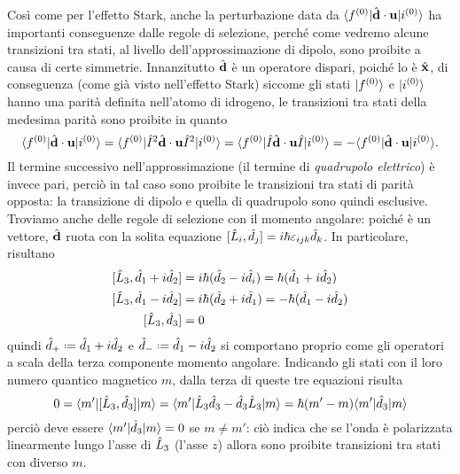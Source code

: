 Cos\`i come per l'effetto Stark, anche la perturbazione data da $\langle f^{(0)}\rvert{\hat{\mathbf{d}}}\cdot{\mathbf{u}}\lvert i^{(0)}\rangle$ ha importanti conseguenze dalle regole di selezione, perch\'e come vedremo alcune transizioni tra stati, al livello dell'approssimazione di dipolo, sono proibite a causa di certe simmetrie.
Innanzitutto $\hat{\mathbf{d}}$ è un operatore dispari, poich\'e lo è $\hat{\mathbf{x}}$, di conseguenza (come già visto nell'effetto Stark) siccome gli stati $\lvert f^{(0)}\rangle$ e $\lvert i^{(0)}\rangle$ hanno una parità definita nell'atomo di idrogeno, le transizioni tra stati della medesima parità sono proibite in quanto
\begin{equation}
	\langle f^{(0)}\rvert{\hat{\mathbf{d}}}\cdot{\mathbf{u}}\lvert i^{(0)}\rangle=
	\langle f^{(0)}\rvert\hat{I}^2{\hat{\mathbf{d}}}\cdot{\mathbf{u}}\hat{I}^2\lvert i^{(0)}\rangle=
	\langle f^{(0)}\rvert\hat{I}{\hat{\mathbf{d}}}\cdot{\mathbf{u}}\hat{I}\lvert i^{(0)}\rangle=
	-\langle f^{(0)}\rvert{\hat{\mathbf{d}}}\cdot{\mathbf{u}}\lvert i^{(0)}\rangle.
\end{equation}
Il termine successivo nell'approssimazione (il termine di \emph{quadrupolo elettrico}) è invece pari, perciò in tal caso sono proibite le transizioni tra stati di parità opposta: la transizione di dipolo e quella di quadrupolo sono quindi esclusive.
Troviamo anche delle regole di selezione con il momento angolare: poich\'e è un vettore, $\hat{\mathbf{d}}$ ruota con la solita equazione $[\hat{L}_i,\hat{d}_j]=i\hbar\varepsilon_{ijk}\hat{d}_k$.
In particolare, risultano
\begin{equation}
	\begin{aligned}
		[\op L_3,\op d_1+i\op d_2]&=i\hbar(\op d_2-i\op d_i)=\hbar(\op d_1+i\op d_2)\\
		[\op L_3,\op d_1-i\op d_2]&=i\hbar(\op d_2+i\op d_1)=-\hbar(\op d_1-i\op d_2)\\
		[\op L_3,\op d_3]&=0
	\end{aligned}
	\label{eq:operatore-dipolo-scala-momento-angolare}
\end{equation}
quindi $\op d_+\defeq \op d_1+i\op d_2$ e $\op d_-\defeq\op d_1-i\op d_2$ si comportano proprio come gli operatori a scala della terza componente momento angolare.
Indicando gli stati con il loro numero quantico magnetico $m$, dalla terza di queste tre equazioni risulta
\begin{equation}
	0=\langle m'\rvert[\hat{L}_3,\hat{d}_3]\lvert m\rangle=\langle m'\rvert\hat{L}_3\hat{d}_3-\hat{d}_3\hat{L}_3\lvert m\rangle=\hbar(m'-m)\langle m'\rvert\hat{d}_3\lvert m\rangle
\end{equation}
perciò deve essere $\langle m'\rvert\hat{d}_3\lvert m\rangle=0$ se $m\ne m'$: ciò indica che se l'onda è polarizzata linearmente lungo l'asse di $\hat{L}_3$ (l'asse $z$) allora sono proibite transizioni tra stati con diverso $m$.
